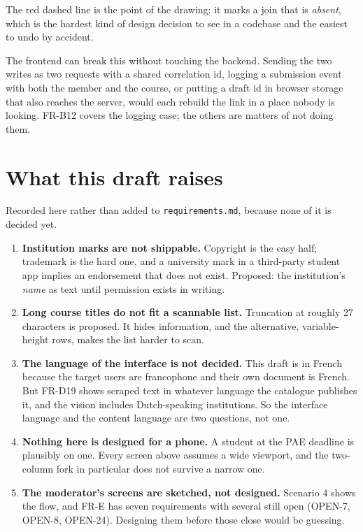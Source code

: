 \documentclass[11pt,a4paper]{article}
\begin{document}
\begin{why}
The red dashed line is the point of the drawing: it marks a join that is
\emph{absent}, which is the hardest kind of design decision to see in a
codebase and the easiest to undo by accident.

The frontend can break this without touching the backend. Sending the two
writes as two requests with a shared correlation id, logging a submission event
with both the member and the course, or putting a draft id in browser storage
that also reaches the server, would each rebuild the link in a place nobody is
looking. FR-B12 covers the logging case; the others are matters of not doing
them.
\end{why}

\section{What this draft raises}

Recorded here rather than added to \texttt{requirements.md}, because none of it
is decided yet.

\begin{enumerate}[leftmargin=*,itemsep=1.5mm]
\item \textbf{Institution marks are not shippable.} Copyright is the easy half;
  trademark is the hard one, and a university mark in a third-party student app
  implies an endorsement that does not exist. Proposed: the institution's
  \emph{name} as text until permission exists in writing.

\item \textbf{Long course titles do not fit a scannable list.} Truncation at
  roughly 27 characters is proposed. It hides information, and the alternative,
  variable-height rows, makes the list harder to scan.

\item \textbf{The language of the interface is not decided.} This draft is in
  French because the target users are francophone and their own document is
  French. But FR-D19 shows scraped text in whatever language the catalogue
  publishes it, and the vision includes Dutch-speaking institutions. So the
  interface language and the content language are two questions, not one.

\item \textbf{Nothing here is designed for a phone.} A student at the PAE
  deadline is plausibly on one. Every screen above assumes a wide viewport, and
  the two-column fork in particular does not survive a narrow one.

\item \textbf{The moderator's screens are sketched, not designed.} Scenario 4
  shows the flow, and FR-E has seven requirements with several still open
  (OPEN-7, OPEN-8, OPEN-24). Designing them before those close would be
  guessing.
\end{enumerate}
\end{document}
